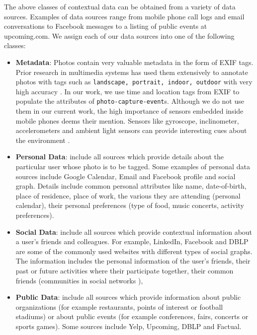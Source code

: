 The above classes of contextual data can be obtained from a variety of data sources. Examples of data sources range from mobile phone call logs and email conversations to Facebook messages to a listing of public events at upcoming.com. We assign each of our data sources into one of the following classes:

\begin{itemize}
\item \textbf{Metadata}: Photos contain very valuable metadata in the form of EXIF tags. Prior research in multimedia systems has used them extensively to annotate photos with tags such as \texttt{landscape, portrait, indoor, outdoor} with very high accuracy \cite{boutell2004photo, sinha2008concept}. In our work, we use time and location tags from EXIF to populate the attributes of \texttt{photo-capture-event}s. Although we do not use them in our current work, the high importance of sensors embedded inside mobile phones deems their mention. Sensors like gyroscope, inclinometer, accelerometers and ambient light sensors can provide interesting cues about the environment \cite{patterson2005assisted, siewiorek2003sensay}.

\item \textbf{Personal Data}: include all sources which provide details about the particular user whose photo is to be tagged. Some examples of personal data sources include Google Calendar, Email and Facebook profile and social graph. Details include common personal attributes like name, date-of-birth, place of residence, place of work, the various they are attending (personal calendar), their personal preferences (type of food, music concerts, activity preferences).

\item \textbf{Social Data}: include all sources which provide contextual information about a user's friends and colleagues. For example, LinkedIn, Facebook and DBLP are some of the commonly used websites with different types of social graphs. The information includes the personal information of the user's friends, their past or future activities where their participate together, their common friends (communities in social networks \cite{backstrom2006group, krawczyk2009communities}), 

\item \textbf{Public Data}: include all sources which provide information about public organizations (for example restaurants, points of interest or football stadiums) or about public events (for example conferences, fairs, concerts or sports games). Some sources include Yelp, Upcoming, DBLP and Factual.
\end{itemize}

